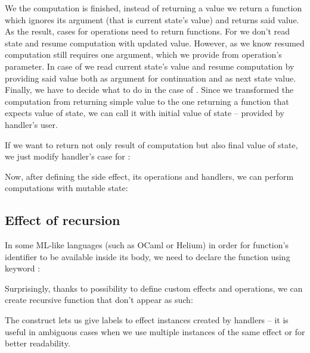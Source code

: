 We the computation is finished, instead of returning a value we return a function which ignores its argument (that is current state's value) and returns said value. As the result, cases for operations need to return functions. For  we don't read state and resume computation with updated value. However, as we know resumed computation still requires one argument, which we provide from operation's parameter. In case of  we read current state's value and resume computation by providing said value both as argument for continuation and as next state value. Finally, we have to decide what to do in the case of . Since we transformed the computation from returning simple value to the one returning a function that expects value of state, we can call it with initial value of state -- provided by handler's user.

If we want to return not only result of computation but also final value of state, we just modify handler's case for :



Now, after defining the side effect, its operations and handlers, we can perform computations with mutable state:


\pagebreak


\subsection{Effect of recursion}

In some ML-like languages (such as OCaml or Helium) in order for function's identifier to be available inside its body, we need to declare the function using keyword :



Surprisingly, thanks to possibility to define custom effects and operations, we can create recursive function that don't appear as such:



The  construct lets us give labels to effect instances created by handlers -- it is useful in ambiguous cases when we use multiple instances of the same effect or for better readability.

